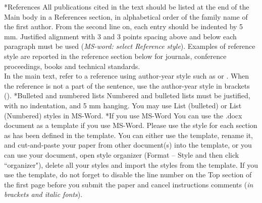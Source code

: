 \documentclass[twocolumn, a4paper,10pt]{article}
\makeatletter
\renewcommand\section{\@startsection{section}{1}{\z@}{3pt}{3pt}{\normalfont\large\bfseries}}
\renewcommand\subsection{\@startsection{subsection}{1}{\z@}{\z@}{\z@}{\normalfont\normalsize\bfseries}}
\renewcommand\subsection{\@startsection{subsection}{1}{\z@}{\z@}{0.1pt}{\normalfont\normalsize\bfseries}}
\makeatother
\begin{document}
\subsection*{References}
All publications cited in the text should be listed at the end of the Main body in a References section, in alphabetical order of the family name of the first author. From the second line on, each entry should be indented by 5 mm. Justified alignment with 3 and 3 points spacing above and below each paragraph must be used (\textit{MS-word: select \textit{Reference style}}). Examples of reference style are reported in the reference section below for journals, conference proceedings, books and technical standards.\\
In the main text, refer to a reference using author-year style such as \citet{Clarke2015:1} or \citet{ChuMajumdar2012}. When the reference is not a part of the sentence, use the author-year style in brackets (\cite{Clarke2015:1, ChuMajumdar2012,Monarim2014, BSDO2011, Mahdavi2011,iso52017}).
\subsection*{Bulleted and numbered lists}
Numbered and bulleted lists must be justified, with no indentation, and 5 mm hanging. You may use List (bulleted) or List (Numbered) styles in MS-Word.
\section*{If you use MS-Word}
You can use the .docx document as a template if you use MS-Word. Please use the style for each section as has been defined in the template. You can either use the template, rename it, and cut-and-paste your paper from other document(s) into the template, or you can use your document, open style organizer (Format – Style and then click ``organizer"), delete all your styles and import the styles from the template.
If you use the template, do not forget to disable the line number on the Top section of the first page before you submit the paper and cancel instructions comments (\textit{in brackets and italic fonts}).
\end{document}
